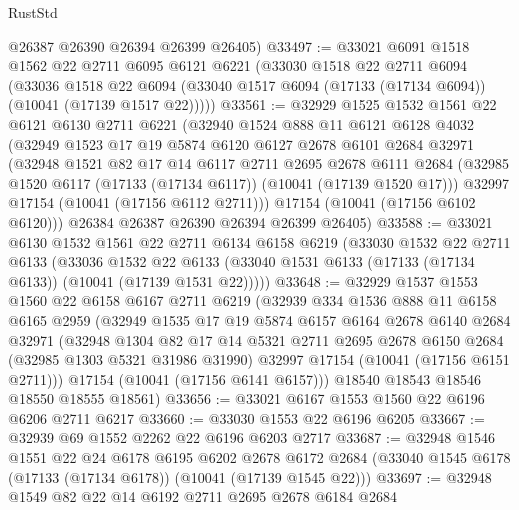 \begin{lexlean}{RustStd}
\begin{coremodule}
      @26387
      @26390
      @26394
      @26399
      @26405)
@33497 := @33021
    @6091
    @1518
    @1562
    @22
    @2711
    @6095
    @6121
    @6221
    (@33030
      @1518
      @22
      @2711
      @6094
      (@33036
        @1518
        @22
        @6094
        (@33040 @1517 @6094 (@17133 (@17134 @6094)) (@10041 (@17139 @1517 @22)))))
@33561 := @32929
    @1525
    @1532
    @1561
    @22
    @6121
    @6130
    @2711
    @6221
    (@32940
      @1524
      @888
      @11
      @6121
      @6128
      @4032
      (@32949
        @1523
        @17
        @19
        @5874
        @6120
        @6127
        @2678
        @6101
        @2684
        @32971
        (@32948
          @1521
          @82
          @17
          @14
          @6117
          @2711
          @2695
          @2678
          @6111
          @2684
          (@32985 @1520 @6117 (@17133 (@17134 @6117)) (@10041 (@17139 @1520 @17)))
          @32997
          @17154
          (@10041 (@17156 @6112 @2711)))
        @17154
        (@10041 (@17156 @6102 @6120)))
      @26384
      @26387
      @26390
      @26394
      @26399
      @26405)
@33588 := @33021
    @6130
    @1532
    @1561
    @22
    @2711
    @6134
    @6158
    @6219
    (@33030
      @1532
      @22
      @2711
      @6133
      (@33036
        @1532
        @22
        @6133
        (@33040 @1531 @6133 (@17133 (@17134 @6133)) (@10041 (@17139 @1531 @22)))))
@33648 := @32929
    @1537
    @1553
    @1560
    @22
    @6158
    @6167
    @2711
    @6219
    (@32939
      @334
      @1536
      @888
      @11
      @6158
      @6165
      @2959
      (@32949
        @1535
        @17
        @19
        @5874
        @6157
        @6164
        @2678
        @6140
        @2684
        @32971
        (@32948
          @1304
          @82
          @17
          @14
          @5321
          @2711
          @2695
          @2678
          @6150
          @2684
          (@32985 @1303 @5321 @31986 @31990)
          @32997
          @17154
          (@10041 (@17156 @6151 @2711)))
        @17154
        (@10041 (@17156 @6141 @6157)))
      @18540
      @18543
      @18546
      @18550
      @18555
      @18561)
@33656 := @33021 @6167 @1553 @1560 @22 @6196 @6206 @2711 @6217
@33660 := @33030 @1553 @22 @6196 @6205
@33667 := @32939 @69 @1552 @2262 @22 @6196 @6203 @2717
@33687 := @32948
    @1546
    @1551
    @22
    @24
    @6178
    @6195
    @6202
    @2678
    @6172
    @2684
    (@33040 @1545 @6178 (@17133 (@17134 @6178)) (@10041 (@17139 @1545 @22)))
@33697 := @32948 @1549 @82 @22 @14 @6192 @2711 @2695 @2678 @6184 @2684

\end{coremodule}
\end{lexlean}

